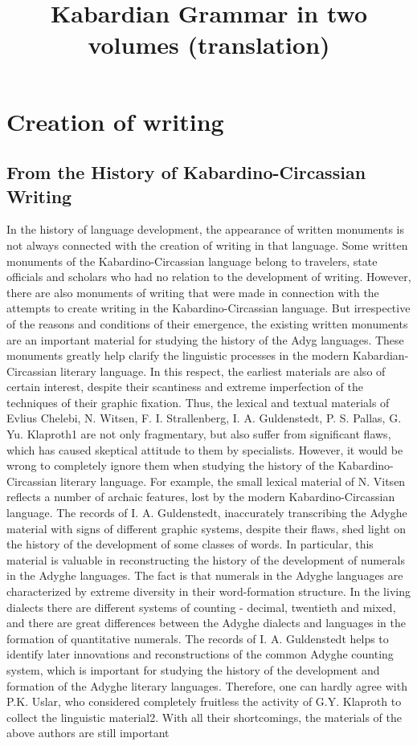 \documentclass[a4paper,12pt]{book}
\title{Kabardian Grammar in two volumes (translation)}
\newcommand{\1}[1]{\textbf{\emph{#1}}} %
\newcommand{\2}[1]{\textbf{[#1]}} %
\newcommand{\3}[1]{\fontsize{11pt}{0cm}\textbf{\emph{#1}}} %
\newcommand{\4}[1]{\fontsize{10pt}{0cm}\emph{#1}}	%
\newcommand{\5}[1]{\textbf{/#1/}} %
\newcommand{\6}[1]{\textbf{[#1]}} %
\newcommand{\7}[1]{\fontsize{12pt}{0cm}\emph{#1}} %
\newcommand{\8}[1]{\fontsize{12pt}{0cm}`#1'} %
\newcommand{\9}[1]{\fontsize{12pt}{0cm}(lit. `#1')} %
\begin{document}
\frontmatter
\maketitle\newpage
\setcounter{tocdepth}{7}\tableofcontents

\newpage
\mainmatter
\chapter{Creation of writing}
\section{From the History of Kabardino-Circassian Writing}
In the history of language development, the appearance of written monuments is not always connected with the creation of writing in that language. Some written monuments of the Kabardino-Circassian language belong to travelers, state officials and scholars who had no relation to the development of writing. However, there are also monuments of writing that were made in connection with the attempts to create writing in the Kabardino-Circassian language. But irrespective of the reasons and conditions of their emergence, the existing written monuments are an important material for studying the history of the Adyg languages. These monuments greatly help clarify the linguistic processes in the modern Kabardian-Circassian literary language. In this respect, the earliest materials are also of certain interest, despite their scantiness and extreme imperfection of the techniques of their graphic fixation. Thus, the lexical and textual materials of Evlius Chelebi, N. Witsen, F. I. Strallenberg, I. A. Guldenstedt, P. S. Pallas, G. Yu. Klaproth1 are not only fragmentary, but also suffer from significant flaws, which has caused skeptical attitude to them by specialists. However, it would be wrong to completely ignore them when studying the history of the Kabardino-Circassian literary language. For example, the small lexical material of N. Vitsen reflects a number of archaic features, lost by the modern Kabardino-Circassian language. The records of I. A. Guldenstedt, inaccurately transcribing the Adyghe material with signs of different graphic systems, despite their flaws, shed light on the history of the development of some classes of words. In particular, this material is valuable in reconstructing the history of the development of numerals in the Adyghe languages. The fact is that numerals in the Adyghe languages are characterized by extreme diversity in their word-formation structure. In the living dialects there are different systems of counting - decimal, twentieth and mixed, and there are great differences between the Adyghe dialects and languages in the formation of quantitative numerals. The records of I. A. Guldenstedt helps to identify later innovations and reconstructions of the common Adyghe counting system, which is important for studying the history of the development and formation of the Adyghe literary languages. Therefore, one can hardly agree with P.K. Uslar, who considered completely fruitless the activity of G.Y. Klaproth to collect the linguistic material2. With all their shortcomings, the materials of the above authors are still important 
\end{document}
